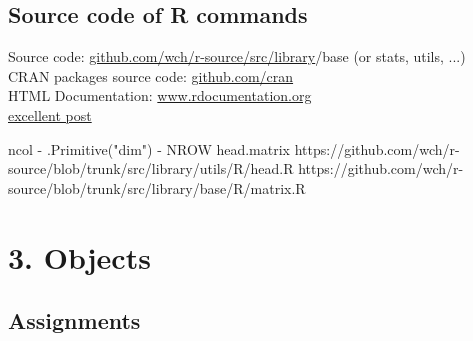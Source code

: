 \documentclass[xcolor=table,       handout,    xcolor=dvipsnames]{beamer}\usepackage[]{graphicx}\usepackage[]{color}
\begin{document}
\subsection{Source code of R commands}

\begin{frame}
Source code: \href{https://github.com/wch/r-source/tree/trunk/src/library}{github.com/wch/r-source/src/library}/base (or stats, utils, ...)\\
CRAN packages source code: \href{https://github.com/cran}{github.com/cran}\\
HTML Documentation: \href{https://www.rdocumentation.org/packages/berryFunctions/versions/1.12.3/topics/colPoints}{www.rdocumentation.org}\\[0.5em]

\href{http://stackoverflow.com/questions/19226816/how-can-i-view-the-source-code-for-a-function}{excellent post}

ncol - .Primitive("dim") - NROW
head.matrix
https://github.com/wch/r-source/blob/trunk/src/library/utils/R/head.R
https://github.com/wch/r-source/blob/trunk/src/library/base/R/matrix.R

\end{frame}

\section{3. Objects}

\subsection{Assignments}
\end{document}
